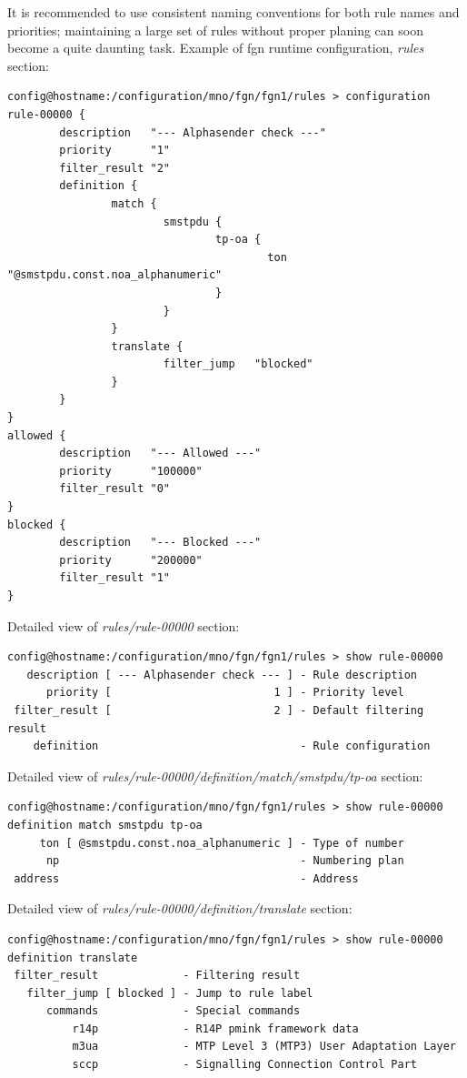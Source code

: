 \documentclass[a4paper,latin]{paper}
\begin{document}
It is recommended to use consistent naming conventions for both \gls{rule} names and priorities; maintaining a large set of \glspl{rule} without proper planing 
can soon become a quite daunting task.
\clearpage
\noindent{}Example of \acrfull{fgn} runtime configuration, \textit{rules} section:
\begin{lstlisting}[style=BashInputStyle, belowskip=\baselineskip]
config@hostname:/configuration/mno/fgn/fgn1/rules > configuration
rule-00000 {
        description   "--- Alphasender check ---"
        priority      "1"                        
        filter_result "2"
        definition {     
                match {
                        smstpdu {
                                tp-oa {
                                        ton     "@smstpdu.const.noa_alphanumeric"
                                }
                        }
                }
                translate {
                        filter_jump   "blocked"
                }
        }        
}
allowed {
        description   "--- Allowed ---"
        priority      "100000"         
        filter_result "0"     
}
blocked {
        description   "--- Blocked ---"
        priority      "200000"         
        filter_result "1"     
}
\end{lstlisting}
Detailed view of \textit{rules/rule-00000} section:
\begin{lstlisting}[style=BashInputStyle, belowskip=\baselineskip]
config@hostname:/configuration/mno/fgn/fgn1/rules > show rule-00000
   description [ --- Alphasender check --- ] - Rule description
      priority [                         1 ] - Priority level  
 filter_result [                         2 ] - Default filtering result
    definition                               - Rule configuration 
\end{lstlisting}
Detailed view of \textit{rules/rule-00000/definition/match/smstpdu/tp-oa} section:
\begin{lstlisting}[style=BashInputStyle, belowskip=\baselineskip]
config@hostname:/configuration/mno/fgn/fgn1/rules > show rule-00000 definition match smstpdu tp-oa
     ton [ @smstpdu.const.noa_alphanumeric ] - Type of number
      np                                     - Numbering plan
 address                                     - Address
\end{lstlisting}
Detailed view of \textit{rules/rule-00000/definition/translate} section:
\begin{lstlisting}[style=BashInputStyle, belowskip=\baselineskip]
config@hostname:/configuration/mno/fgn/fgn1/rules > show rule-00000 definition translate
 filter_result             - Filtering result
   filter_jump [ blocked ] - Jump to rule label
      commands             - Special commands  
          r14p             - R14P pmink framework data
          m3ua             - MTP Level 3 (MTP3) User Adaptation Layer
          sccp             - Signalling Connection Control Part
\end{lstlisting}
\end{document}
